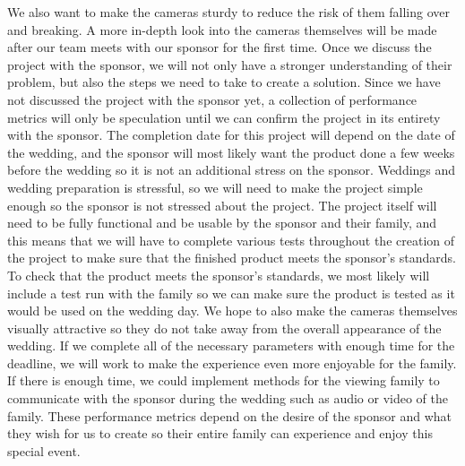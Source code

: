 \documentclass[onecolumn, draftclsnofoot,10pt, compsoc]{IEEEtran}
\begin{document}
We also want to make the cameras sturdy to reduce the risk of them falling over and breaking.
A more in-depth look into the cameras themselves will be made after our team meets with our sponsor for the first time.
Once we discuss the project with the sponsor, we will not only have a stronger understanding of their problem, but also the steps we need to take to create a solution.
\newline
\newline
Since we have not discussed the project with the sponsor yet, a collection of performance metrics will only be speculation until we can confirm the project in its entirety with the sponsor.
The completion date for this project will depend on the date of the wedding, and the sponsor will most likely want the product done a few weeks before the wedding so it is not an additional stress on the sponsor.
Weddings and wedding preparation is stressful, so we will need to make the project simple enough so the sponsor is not stressed about the project. 
The project itself will need to be fully functional and be usable by the sponsor and their family, and this means that we will have to complete various tests throughout the creation of the project to make sure that the finished product meets the sponsor's standards.
To check that the product meets the sponsor's standards, we most likely will include a test run with the family so we can make sure the product is tested as it would be used on the wedding day.
We hope to also make the cameras themselves visually attractive so they do not take away from the overall appearance of the wedding. 
If we complete all of the necessary parameters with enough time for the deadline, we will work to make the experience even more enjoyable for the family.
If there is enough time, we could implement methods for the viewing family to communicate with the sponsor during the wedding such as audio or video of the family.
These performance metrics depend on the desire of the sponsor and what they wish for us to create so their entire family can experience and enjoy this special event.
\end{document}
